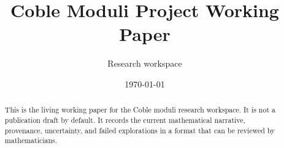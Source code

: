 \documentclass[11pt]{article}
\title{Coble Moduli Project Working Paper}
\author{Research workspace}
\date{\today}
\theoremstyle{definition}
\theoremstyle{remark}
\begin{document}
\maketitle

\begin{abstract}
This is the living working paper for the Coble moduli research workspace. It is not a
publication draft by default. It records the current mathematical narrative, provenance,
uncertainty, and failed explorations in a format that can be reviewed by mathematicians.
\end{abstract}

\tableofcontents






\end{document}
